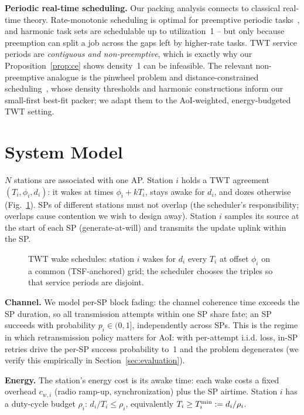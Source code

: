 \textbf{Periodic real-time scheduling.} Our packing analysis connects to
classical real-time theory. Rate-monotonic scheduling is optimal for
preemptive periodic tasks~\cite{liu73}, and harmonic task sets are schedulable
up to utilization~1 -- but only because preemption can split a job across the
gaps left by higher-rate tasks. TWT service periods are \emph{contiguous and
non-preemptive}, which is exactly why our Proposition~\ref{prop:ce} shows
density~1 can be infeasible. The relevant non-preemptive analogue is the
pinwheel problem and distance-constrained scheduling~\cite{holte89,han92,chan92},
whose density thresholds and harmonic constructions inform our
small-first best-fit packer; we adapt them to the AoI-weighted, energy-budgeted
TWT setting.

\section{System Model}
\label{sec:model}

$N$ stations are associated with one AP. Station $i$ holds a TWT agreement
$(T_i, \phi_i, d_i)$: it wakes at times $\phi_i + k T_i$, stays awake for
$d_i$, and dozes otherwise (Fig.~\ref{fig:mechanism}). SPs of different
stations must not overlap (the scheduler's responsibility; overlaps cause
contention we wish to design away). Station $i$ samples its source at the
start of each SP (generate-at-will) and transmits the update uplink within
the SP.

\begin{figure}[t]
\centering

\caption{TWT wake schedules: station $i$ wakes for $d_i$ every $T_i$ at
offset $\phi_i$ on a common (TSF-anchored) grid; the scheduler chooses the
triples so that service periods are disjoint.}
\label{fig:mechanism}
\end{figure}

\textbf{Channel.} We model per-SP block fading: the channel coherence time
exceeds the SP duration, so all transmission attempts within one SP share
fate; an SP succeeds with probability $p_i \in (0,1]$, independently across
SPs. This is the regime in which retransmission policy matters for AoI: with
per-attempt i.i.d. loss, in-SP retries drive the per-SP success probability
to~1 and the problem degenerates (we verify this empirically in
Section~\ref{sec:evaluation}).

\textbf{Energy.} The station's energy cost is its awake time: each wake costs
a fixed overhead $c_{w,i}$ (radio ramp-up, synchronization) plus the SP
airtime. Station $i$ has a duty-cycle budget $\rho_i$:
$d_i / T_i \le \rho_i$, equivalently $T_i \ge T^{\min}_i := d_i/\rho_i$.

